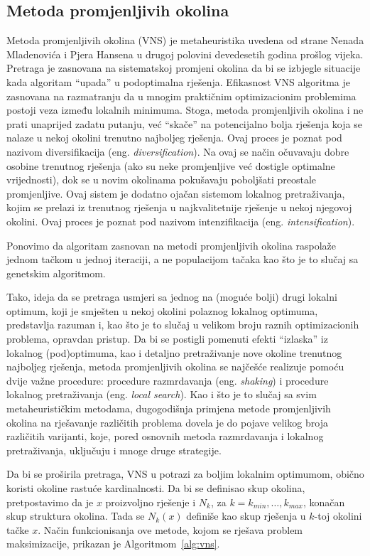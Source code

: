 \documentclass[a4paper, utf8, 11pt, colorlinks]{book}
\theoremstyle{definition}
\begin{document}
\subsection{Metoda promjenljivih okolina}\label{intro:vns}
Metoda promjenljivih okolina (VNS) je metaheuristika uvedena od strane Nenada Mladenovića i Pjera Hansena u drugoj polovini devedesetih godina prošlog vijeka.
Pretraga je zasnovana na sistematskoj promjeni okolina da bi se izbjegle situacije kada algoritam ``upada'' u podoptimalna rješenja. Efikasnost VNS algoritma je zasnovana na razmatranju da u mnogim praktičnim optimizacionim problemima postoji veza između lokalnih minimuma. Stoga, metoda promjenljivih okolina i ne prati unaprijed zadatu putanju, već ``skače'' na potencijalno bolja rješenja koja se nalaze u nekoj okolini trenutno najboljeg rješenja. Ovaj proces je poznat pod nazivom diversifikacija (eng. \emph{diversification}).
Na ovaj se način očuvavaju dobre osobine trenutnog rješenja (ako su neke promjenljive već dostigle optimalne vrijednosti), dok se u novim okolinama pokušavaju poboljšati preostale promjenljive. Ovaj sistem je dodatno ojačan sistemom lokalnog pretraživanja, kojim se prelazi iz trenutnog rješenja u najkvalitetnije rješenje u nekoj njegovoj okolini. Ovaj proces je poznat pod nazivom intenzifikacija (eng. \emph{intensification}).

Ponovimo da algoritam zasnovan na metodi promjenljivih okolina raspolaže jednom tačkom u jednoj iteraciji, a ne populacijom tačaka kao što je to slučaj sa genetskim algoritmom.

Tako, ideja da se pretraga usmjeri sa jednog na (moguće bolji) drugi lokalni optimum, koji je smješten u nekoj okolini polaznog lokalnog optimuma, predstavlja razuman  i, kao što je to slučaj u velikom broju raznih optimizacionih problema, opravdan pristup.
Da bi se postigli pomenuti efekti ``izlaska'' iz lokalnog (pod)optimuma, kao i detaljno pretraživanje nove okoline trenutnog najboljeg rješenja, metoda promjenljivih okolina se najčešće realizuje pomoću dvije važne procedure: procedure razmrdavanja (eng. \emph{shaking}) i procedure lokalnog pretraživanja (eng. \emph{local search}). Kao i što je to slučaj sa svim metaheurističkim metodama, dugogodišnja primjena metode promjenljivih okolina na rješavanje različitih problema dovela je do pojave velikog broja različitih varijanti, koje, pored osnovnih metoda razmrdavanja i lokalnog pretraživanja, uključuju i mnoge druge strategije.

Da bi se proširila pretraga,  VNS u potrazi za boljim lokalnim optimumom, obično koristi okoline rastuće kardinalnosti. Da bi se definisao skup okolina, pretpostavimo da je $x$ proizvoljno rješenje i $N_k$, za $k=k_{min},\ldots,k_{max}$, konačan skup struktura okolina. Tada se  $N_k(x)$ definiše kao skup rješenja u $k$-toj okolini tačke $x$. 
Način funkcionisanja ove metode, kojom se rješava problem maksimizacije, prikazan je Algoritmom~\ref{alg:vns}. 
\end{document}
